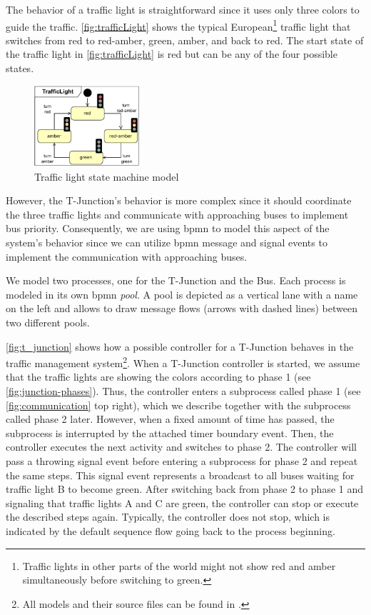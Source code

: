 \documentclass{jot}
\begin{document}
The behavior of a traffic light is straightforward since it uses only three colors to guide the traffic.
\autoref{fig:trafficLight} shows the typical European\footnote{Traffic lights in other parts of the world might not show red and amber simultaneously before switching to green.} traffic light that switches from \textsf{red} to \textsf{red-amber}, \textsf{green}, \textsf{amber}, and back to \textsf{red}.
The start state of the traffic light in \autoref{fig:trafficLight} is \textsf{red} but can be any of the four possible states.

\begin{figure}[h]
    \centering
    \includegraphics[width=0.35\textwidth]{figures/trafficLight.pdf}
    \caption{Traffic light state machine model}
    \label{fig:trafficLight}
\end{figure}

However, the T-Junction's behavior is more complex since it should coordinate the three traffic lights and communicate with approaching buses to implement bus priority.
Consequently, we are using \gls*{bpmn} to model this aspect of the system's behavior since we can utilize \gls*{bpmn} message and signal events to implement the communication with approaching buses.

We model two processes, one for the T-Junction and the Bus.
Each process is modeled in its own \gls*{bpmn} \emph{pool}.
A pool is depicted as a vertical lane with a name on the left and allows to draw message flows (arrows with dashed lines) between two different pools.

\autoref{fig:t_junction} shows how a possible controller for a T-Junction behaves in the traffic management system\footnote{All models and their source files can be found in \cite{krauterArtifactsBehavioralConsistency2022}.\label{footnote:fullModels}}.
When a T-Junction controller is started, we assume that the traffic lights are showing the colors according to phase 1 (see \autoref{fig:junction-phases}).
Thus, the controller enters a subprocess called phase 1 (see \autoref{fig:communication} top right), which we describe together with the subprocess called phase 2 later.
However, when a fixed amount of time has passed, the subprocess is interrupted by the attached timer boundary event.
Then, the controller executes the next activity and switches to phase 2.
The controller will pass a throwing signal event before entering a subprocess for phase 2 and repeat the same steps.
This signal event represents a broadcast to all buses waiting for traffic light B to become green.
After switching back from phase 2 to phase 1 and signaling that traffic lights A and C are green, the controller can stop or execute the described steps again.
Typically, the controller does not stop, which is indicated by the default sequence flow going back to the process beginning.
\end{document}
